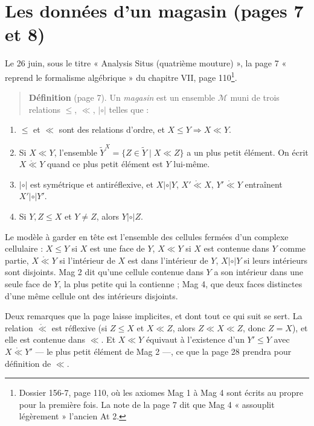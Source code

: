 \documentclass[11pt,a4paper]{article}
\begin{document}
\section*{Les données d'un magasin (pages 7 et 8)}

Le 26 juin, sous le titre « Analysis Situs (quatrième mouture) », la page 7
« reprend le formalisme algébrique » du chapitre VII, page 110\footnote{Dossier
156-7, page 110, où les axiomes Mag 1 à Mag 4 sont écrits au propre pour la
première fois. La note de la page 7 dit que Mag 4 « assouplit légèrement »
l'ancien At 2.}.

\begin{quote}
\textbf{Définition} (page 7). Un \emph{magasin} est un ensemble $\mathcal{M}$
muni de trois relations $\leq$, $\ll$, $\mathrel{|\circ|}$ telles que :
\end{quote}
\begin{enumerate}
\item[Mag 1.] $\leq$ et $\ll$ sont des relations d'ordre, et $X \leq Y
\Rightarrow X \ll Y$.
\item[Mag 2.] Si $X \ll Y$, l'ensemble $\widetilde{Y}^{X} = \{Z \in
\widetilde{Y} \mid X \ll Z\}$ a un plus petit élément. On écrit $X
\mathrel{\mathring{\ll}} Y$ quand ce plus petit élément est $Y$ lui-même.
\item[Mag 3.] $\mathrel{|\circ|}$ est symétrique et antiréflexive, et
$X \mathrel{|\circ|} Y$, $X' \mathrel{\mathring{\ll}} X$, $Y'
\mathrel{\mathring{\ll}} Y$ entraînent $X' \mathrel{|\circ|} Y'$.
\item[Mag 4.] Si $Y, Z \leq X$ et $Y \neq Z$, alors $Y \mathrel{|\circ|} Z$.
\end{enumerate}


Le modèle à garder en tête est l'ensemble des cellules fermées d'un complexe
cellulaire : $X \leq Y$ si $X$ est une face de $Y$, $X \ll Y$ si $X$ est
contenue dans $Y$ comme partie, $X \mathrel{\mathring{\ll}} Y$ si l'intérieur
de $X$ est dans l'intérieur de $Y$, $X \mathrel{|\circ|} Y$ si leurs intérieurs
sont disjoints. Mag 2 dit qu'une cellule contenue dans $Y$ a son intérieur dans
une seule face de $Y$, la plus petite qui la contienne ; Mag 4, que deux faces
distinctes d'une même cellule ont des intérieurs disjoints.

Deux remarques que la page laisse implicites, et dont tout ce qui suit se sert.
La relation $\mathring{\ll}$ est réflexive (si $Z \leq X$ et $X \ll Z$, alors
$Z \ll X \ll Z$, donc $Z = X$), et elle est contenue dans $\ll$. Et $X \ll Y$
équivaut à l'existence d'un $Y' \leq Y$ avec $X \mathrel{\mathring{\ll}} Y'$
--- le plus petit élément de Mag 2 ---, ce que la page 28 prendra pour
définition de $\ll$.
\end{document}
